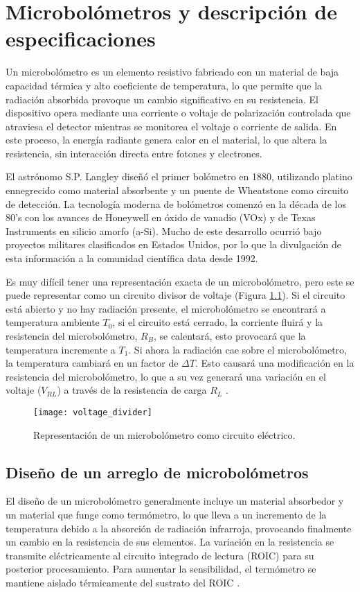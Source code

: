 \chapter{Microbolómetros y descripción de especificaciones}
Un microbolómetro es un elemento resistivo fabricado con un material de baja capacidad térmica y alto coeficiente de temperatura, lo que permite que la radiación absorbida provoque un cambio significativo en su resistencia. El dispositivo opera mediante una corriente o voltaje de polarización controlada que atraviesa el detector mientras se monitorea el voltaje o corriente de salida. En este proceso, la energía radiante genera calor en el material, lo que altera la resistencia, sin interacción directa entre fotones y electrones.


El astrónomo S.P. Langley diseñó el primer bolómetro en 1880, utilizando platino ennegrecido como material absorbente y un puente de Wheatstone como circuito de detección. La tecnología moderna de bolómetros comenzó en la década de los 80's con los avances de Honeywell en óxido de vanadio (VOx) y de Texas Instruments en silicio amorfo (a-Si). Mucho de este desarrollo ocurrió bajo proyectos militares clasificados en Estados Unidos, por lo que la divulgación de esta información a la comunidad científica data desde 1992.


Es muy difícil tener una representación exacta de un microbolómetro, pero este se puede representar como un circuito divisor de voltaje (Figura \ref{fig:voltage_divider}). Si el circuito está abierto y no hay radiación presente, el microbolómetro se encontrará a temperatura ambiente $T_{0}$, si el circuito está cerrado, la corriente fluirá y la resistencia del microbolómetro, $R_{B}$, se calentará, esto provocará que la temperatura incremente a $T_{1}$. Si ahora la radiación cae sobre el microbolómetro, la temperatura cambiará en un factor de $\Delta T$. Esto causará una modificación en la resistencia del microbolómetro, lo que a su vez generará una variación en el voltaje ($V_{RL}$) a través de la resistencia de carga $R_{L}$ \cite{Rogalski}. 

            \begin{figure}[hbtp]
                \centering
                \texttt{[image: voltage\_divider]}
                \caption{Representación de un microbolómetro como circuito eléctrico.}
                \label{fig:voltage_divider}
            \end{figure} 

\section{Diseño de un arreglo de microbolómetros}
El diseño de un microbolómetro generalmente incluye un material absorbedor y un material que funge como termómetro, lo que lleva a un incremento de la temperatura debido a la absorción de radiación infrarroja, provocando finalmente un cambio en la resistencia de sus elementos. La variación en la resistencia se transmite eléctricamente al circuito integrado de lectura (ROIC) para su posterior procesamiento. Para aumentar la sensibilidad, el termómetro se mantiene aislado térmicamente del sustrato del ROIC \cite{Bhan2009}.


